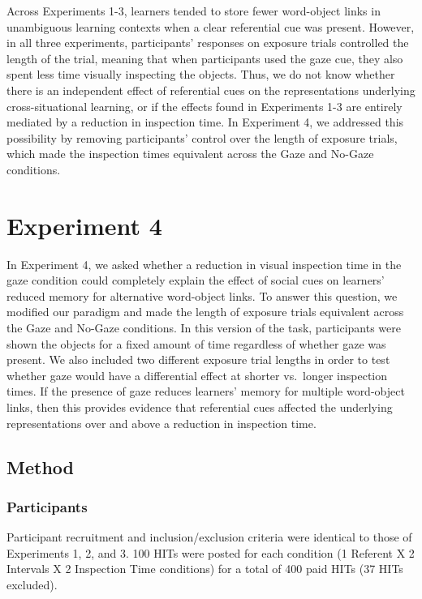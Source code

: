 \documentclass[oneside]{report}
\begin{document}
Across Experiments 1-3, learners tended to store fewer word-object links
in unambiguous learning contexts when a clear referential cue was
present. However, in all three experiments, participants' responses on
exposure trials controlled the length of the trial, meaning that when
participants used the gaze cue, they also spent less time visually
inspecting the objects. Thus, we do not know whether there is an
independent effect of referential cues on the representations underlying
cross-situational learning, or if the effects found in Experiments 1-3
are entirely mediated by a reduction in inspection time. In Experiment
4, we addressed this possibility by removing participants' control over
the length of exposure trials, which made the inspection times
equivalent across the Gaze and No-Gaze conditions.

\section{Experiment 4}\label{experiment-4}

In Experiment 4, we asked whether a reduction in visual inspection time
in the gaze condition could completely explain the effect of social cues
on learners' reduced memory for alternative word-object links. To answer
this question, we modified our paradigm and made the length of exposure
trials equivalent across the Gaze and No-Gaze conditions. In this
version of the task, participants were shown the objects for a fixed
amount of time regardless of whether gaze was present. We also included
two different exposure trial lengths in order to test whether gaze would
have a differential effect at shorter vs.~longer inspection times. If
the presence of gaze reduces learners' memory for multiple word-object
links, then this provides evidence that referential cues affected the
underlying representations over and above a reduction in inspection
time.

\subsection{Method}\label{method-3}

\subsubsection{Participants}\label{participants-3}

Participant recruitment and inclusion/exclusion criteria were identical
to those of Experiments 1, 2, and 3. 100 HITs were posted for each
condition (1 Referent X 2 Intervals X 2 Inspection Time conditions) for
a total of 400 paid HITs (37 HITs excluded).
\end{document}
